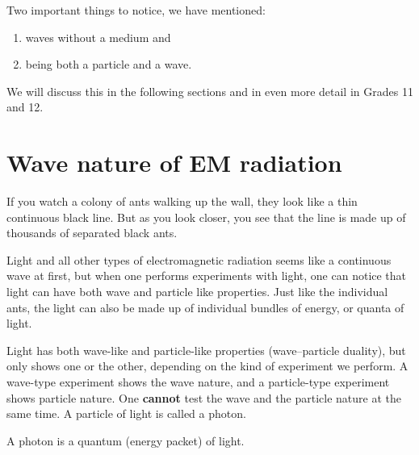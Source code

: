 Two important things to notice, we have mentioned:
\begin{enumerate}[noitemsep, label=\textbf{\arabic*}. ]
 \item waves without a medium and
 \item being both a particle and a wave.
\end{enumerate}
We will discuss this in the following sections and in even more detail in Grades 11 and 12.

    \label{m38777*cid3}
            \section{Wave nature of EM radiation}
            \nopagebreak
      \label{m38777*id186686}If you watch a colony of ants walking up the wall, they look like a thin continuous black line. But as you look closer, you see that the line is made up of thousands of separated black ants.\par 
      \label{m38777*id187029}Light and all other types of electromagnetic radiation seems like a continuous wave at first, but when one performs experiments with light, one can notice that light can have both wave and particle like properties. Just like the individual ants, the light can also be made up of individual bundles of energy, or quanta of light.\par 
      \label{m38777*id187035}Light has both wave-like and particle-like properties (wave--particle duality), but only shows one or the other, depending on the kind of experiment we perform. A wave-type experiment shows the wave nature, and a particle-type experiment shows particle nature. One \textbf{cannot} test the wave and the particle nature at the same time. A particle of light is called a photon.\par 




\label{m38777*fhsst!!!underscore!!!id75} { \label{m38777*meaningfhsst!!!underscore!!!id75}
      \label{m38777*id187051}A photon is a quantum (energy packet) of light. \par 
       } 


